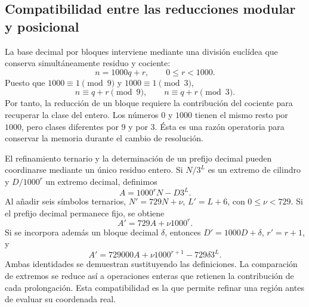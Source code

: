 \subsection{Compatibilidad entre las reducciones modular y posicional}

La base decimal por bloques interviene mediante una división euclídea
que conserva simultáneamente residuo y cociente:
\[
 n=1000q+r,\qquad 0\le r<1000.
\]
Puesto que \(1000\equiv1\pmod9\) y \(1000\equiv1\pmod3\),
\[
 n\equiv q+r\pmod9,\qquad n\equiv q+r\pmod3.
\]
Por tanto, la reducción de un bloque requiere la contribución del
cociente para recuperar la clase del entero. Los números \(0\) y
\(1000\) tienen el mismo resto por \(1000\), pero clases diferentes
por \(9\) y por \(3\). Ésta es una razón operatoria para conservar
la memoria durante el cambio de resolución.

El refinamiento ternario y la determinación de un prefijo decimal
pueden coordinarse mediante un único residuo entero. Si \(N/3^L\)
es un extremo de cilindro y \(D/1000^r\) un extremo decimal, definimos
\[
 A=1000^rN-D3^L.
\]
Al añadir seis símbolos ternarios, \(N'=729N+\nu\),
\(L'=L+6\), con \(0\le\nu<729\). Si el prefijo decimal permanece
fijo, se obtiene
\[
 A'=729A+\nu1000^r.
\]
Si se incorpora además un bloque decimal \(\delta\), entonces
\(D'=1000D+\delta\), \(r'=r+1\), y
\begin{equation}
 A'=729000A+\nu1000^{r+1}-729\delta3^L.
 \label{x_reciprocidad:eq:residuo-dos-bases}
\end{equation}
Ambas identidades se demuestran sustituyendo las definiciones. La
comparación de extremos se reduce así a operaciones enteras que
retienen la contribución de cada prolongación. Esta compatibilidad
es la que permite refinar una región antes de evaluar su coordenada real.




